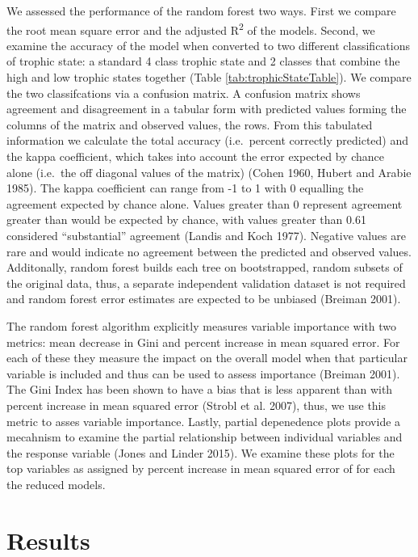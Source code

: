 \documentclass[11pt,]{article}
\begin{document}
We assessed the performance of the random forest two ways. First we
compare the root mean square error and the adjusted R\textsuperscript{2}
of the models. Second, we examine the accuracy of the model when
converted to two different classifications of trophic state: a standard
4 class trophic state and 2 classes that combine the high and low
trophic states together (Table \ref{tab:trophicStateTable}). We compare
the two classifcations via a confusion matrix. A confusion matrix shows
agreement and disagreement in a tabular form with predicted values
forming the columns of the matrix and observed values, the rows. From
this tabulated information we calculate the total accuracy (i.e.~percent
correctly predicted) and the kappa coefficient, which takes into account
the error expected by chance alone (i.e.~the off diagonal values of the
matrix) (Cohen 1960, Hubert and Arabie 1985). The kappa coefficient can
range from -1 to 1 with 0 equalling the agreement expected by chance
alone. Values greater than 0 represent agreement greater than would be
expected by chance, with values greater than 0.61 considered
``substantial'' agreement (Landis and Koch 1977). Negative values are
rare and would indicate no agreement between the predicted and observed
values. Additonally, random forest builds each tree on bootstrapped,
random subsets of the original data, thus, a separate independent
validation dataset is not required and random forest error estimates are
expected to be unbiased (Breiman 2001).

The random forest algorithm explicitly measures variable importance with
two metrics: mean decrease in Gini and percent increase in mean squared
error. For each of these they measure the impact on the overall model
when that particular variable is included and thus can be used to assess
importance (Breiman 2001). The Gini Index has been shown to have a bias
that is less apparent than with percent increase in mean squared error
(Strobl et al. 2007), thus, we use this metric to asses variable
importance. Lastly, partial depenedence plots provide a mecahnism to
examine the partial relationship between individual variables and the
response variable (Jones and Linder 2015). We examine these plots for
the top variables as assigned by percent increase in mean squared error
of for each the reduced models.

\section{Results}\label{results}
\end{document}
